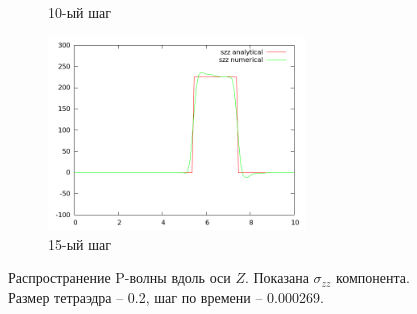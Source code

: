 \begin{figure}[H]
\begin{subfigure}[b]{0.5\textwidth}
\caption{10-ый шаг}
\end{subfigure}
\begin{subfigure}[b]{0.5\textwidth}
\centering
\includegraphics[width=0.75\textwidth]{png/veryfication/0.2/p-wave-along-z15.png}
\caption{15-ый шаг}
\end{subfigure}
\caption{Распространение P-волны вдоль оси $Z$. Показана $\sigma_{zz}$ компонента. Размер тетраэдра -- 0.2, шаг по времени -- 0.000269. }
\label{pic:p_wave_along_z2}
\end{figure}

